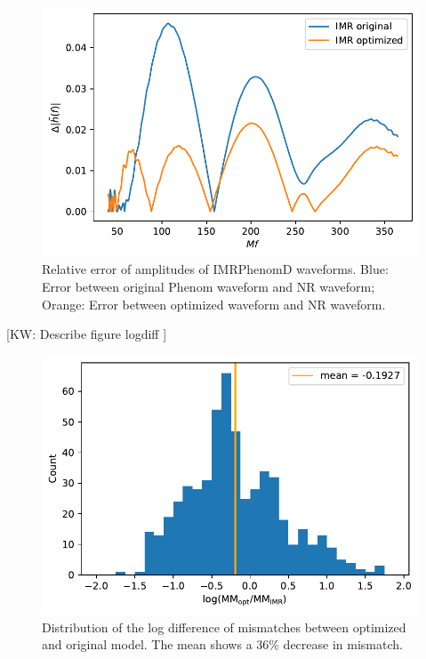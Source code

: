 \documentclass[twocolumn]{aastex631}
\newcommand{\kw}[1]{{\color{rb4}[KW: #1 ]}}
\begin{document}
\begin{figure}[t]
\centering
\includegraphics[width=\linewidth]{../static/amplitude_loss.pdf}
\caption{ Relative error of amplitudes of IMRPhenomD waveforms. Blue: Error
    between original Phenom waveform and NR waveform; Orange: Error between
    optimized waveform and NR waveform. }
\label{fig:loss_compare}
\end{figure}

\kw{Describe figure logdiff}

\begin{figure}[t]
\centering
\includegraphics[width=\linewidth]{../static/MM_logdiff_q148.pdf}
\caption{ Distribution of the log difference of mismatches between optimized
    and original model. The mean shows a 36\% decrease in mismatch. }
\label{fig:MM_logdiff}
\end{figure}
\end{document}
